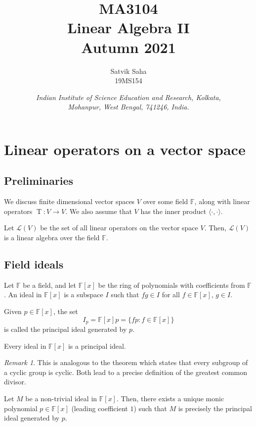 \documentclass[11pt]{article}
\title{
    \Large\textsc{MA3104} \\
    \Huge \textbf{Linear Algebra II} \\
    \vspace{5pt}
    \Large{Autumn 2021}
}
\author{
    \large Satvik Saha
    \\\textsc{\small 19MS154}
}
\date{\normalsize
    \textit{Indian Institute of Science Education and Research, Kolkata, \\
    Mohanpur, West Bengal, 741246, India.} \\
}
\newcommand{\F}{\mathbb{F}}
\newcommand{\op}[1]{\operatorname{#1}}
\newcommand{\opT}{\op{T}}
\newcommand{\alg}[1]{\mathscr{#1}}
\newcommand{\algL}{\alg{L}}
\newcommand{\ip}[2]{\langle #1, #2 \rangle}
\theoremstyle{definition}
\theoremstyle{remark}
\newtheorem*{remark}{Remark}
\numberwithin{equation}{section}
\begin{document}
    \maketitle

    \tableofcontents

    \section{Linear operators on a vector space}

    \subsection{Preliminaries}
    We discuss finite dimensional vector spaces $V$ over some field $\F$, along with
    linear operators $\opT\colon V \to V$. We also assume that $V$ has the inner
    product $\ip{\cdot}{\cdot}$.

    \begin{theorem}
        Let $\alg{L}(V)$ be the set of all linear operators on the vector space $V$.
        Then, $\algL(V)$ is a linear algebra over the field $\F$.
    \end{theorem}

    \subsection{Field ideals}
    \begin{definition}
        Let $\F$ be a field, and let $\F[x]$ be the ring of polynomials with
        coefficients from $\F$. An ideal in $\F[x]$ is a subspace $I$ such that $fg
        \in I$ for all $f \in \F[x]$, $g \in I$.
    \end{definition}

    \begin{definition}
        Given $p \in \F[x]$, the set \[
            I_p = \F[x]p = \{fp : f \in \F[x]\}
        \] is called the principal ideal generated by $p$.
    \end{definition}

    \begin{theorem}
        Every ideal in $\F[x]$ is a principal ideal.
        \begin{remark}
            This is analogous to the theorem which states that every subgroup of a
            cyclic group is cyclic. Both lead to a precise definition of the greatest
            common divisor.
        \end{remark}
    \end{theorem}
    \begin{corollary}
        Let $M$ be a non-trivial ideal in $\F[x]$. Then, there exists a unique monic
        polynomial $p \in \F[x]$ (leading coefficient $1$) such that $M$ is precisely
        the principal ideal generated by $p$.
    \end{corollary}
\end{document}
